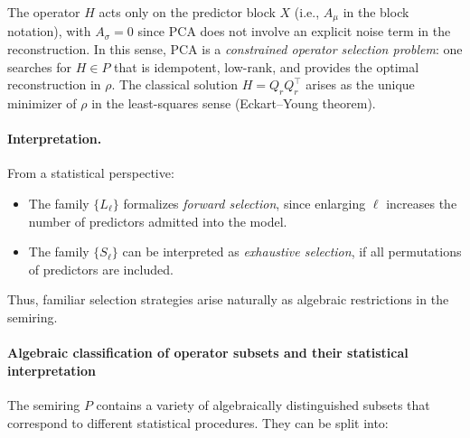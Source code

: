 The operator \(H\) acts only on the predictor block \(X\) (i.e., \(A_\mu\) in the block notation), with \(A_\sigma = 0\) since PCA does not involve an explicit noise term in the reconstruction. In this sense, PCA is a \emph{constrained operator selection problem}: one searches for \(H \in P\) that is idempotent, low-rank, and provides the optimal reconstruction in \(\rho\). The classical solution \(H = Q_r Q_r^\top\) arises as the unique minimizer of \(\rho\) in the least-squares sense (Eckart–Young theorem).

\paragraph{Interpretation.}
From a statistical perspective:
\begin{itemize}
  \item The family \(\{L_\ell\}\) formalizes \emph{forward selection}, since enlarging \(\ell\) increases the number of predictors admitted into the model.  
  \item The family \(\{S_\ell\}\) can be interpreted as \emph{exhaustive selection}, if all permutations of predictors are included.
\end{itemize}
Thus, familiar selection strategies arise naturally as algebraic restrictions in the semiring.

\paragraph{Algebraic classification of operator subsets and their statistical interpretation}

The semiring $P$ contains a variety of algebraically distinguished subsets that correspond to different statistical procedures. They can be split into:

